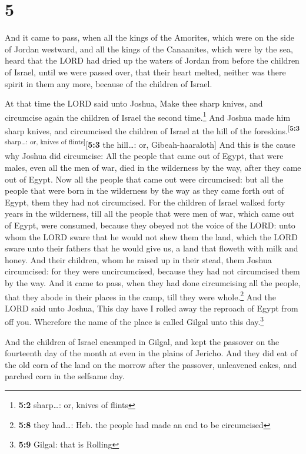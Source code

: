 \hypertarget{section-4}{%
\section{5}\label{section-4}}

 And it came to pass, when all the kings of the Amorites,
which were on the side of Jordan westward, and all the kings of the
Canaanites, which were by the sea, heard that the LORD had dried up the
waters of Jordan from before the children of Israel, until we were
passed over, that their heart melted, neither was there spirit in them
any more, because of the children of Israel.

 At that time the LORD said unto Joshua, Make thee sharp
knives, and circumcise again the children of Israel the second
time.\footnote{\textbf{5:2} sharp\ldots: or, knives of flints}
 And Joshua made him sharp knives, and circumcised the
children of Israel at the hill of the
foreskins.\textsuperscript{{[}\textbf{5:3} sharp\ldots: or, knives of
flints{]}}{[}\textbf{5:3} the hill\ldots: or, Gibeah-haaraloth{]}
 And this is the cause why Joshua did circumcise: All the
people that came out of Egypt, that were males, even all the men of war,
died in the wilderness by the way, after they came out of Egypt.
 Now all the people that came out were circumcised: but
all the people that were born in the wilderness by the way as they came
forth out of Egypt, them they had not circumcised.  For
the children of Israel walked forty years in the wilderness, till all
the people that were men of war, which came out of Egypt, were consumed,
because they obeyed not the voice of the LORD: unto whom the LORD sware
that he would not shew them the land, which the LORD sware unto their
fathers that he would give us, a land that floweth with milk and honey.
 And their children, whom he raised up in their stead,
them Joshua circumcised: for they were uncircumcised, because they had
not circumcised them by the way.  And it came to pass,
when they had done circumcising all the people, that they abode in their
places in the camp, till they were whole.\footnote{\textbf{5:8} they
  had\ldots: Heb. the people had made an end to be circumcised}
 And the LORD said unto Joshua, This day have I rolled
away the reproach of Egypt from off you. Wherefore the name of the place
is called Gilgal unto this day.\footnote{\textbf{5:9} Gilgal: that is
  Rolling}

 And the children of Israel encamped in Gilgal, and kept
the passover on the fourteenth day of the month at even in the plains of
Jericho.  And they did eat of the old corn of the land on
the morrow after the passover, unleavened cakes, and parched corn in the
selfsame day.

